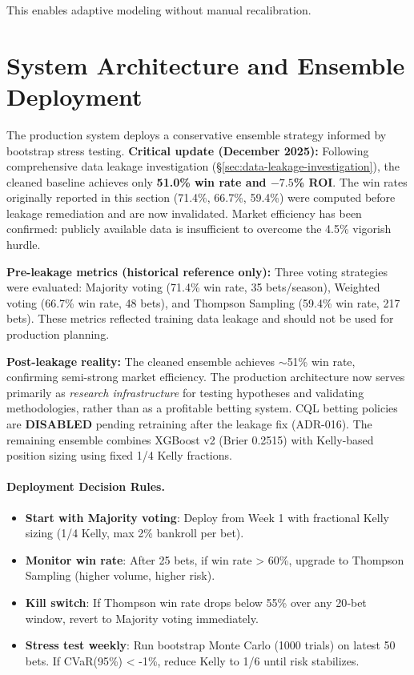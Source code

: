 This enables adaptive modeling without manual recalibration.

\section{System Architecture and Ensemble Deployment}
\label{sec:system_architecture}

The production system deploys a conservative ensemble strategy informed by bootstrap stress testing. \textbf{Critical update (December 2025):} Following comprehensive data leakage investigation (\S\ref{sec:data-leakage-investigation}), the cleaned baseline achieves only \textbf{51.0\% win rate and $-7.5$\% ROI}. The win rates originally reported in this section (71.4\%, 66.7\%, 59.4\%) were computed before leakage remediation and are now invalidated. Market efficiency has been confirmed: publicly available data is insufficient to overcome the 4.5\% vigorish hurdle.

\textbf{Pre-leakage metrics (historical reference only):} Three voting strategies were evaluated: Majority voting (71.4\% win rate, 35 bets/season), Weighted voting (66.7\% win rate, 48 bets), and Thompson Sampling (59.4\% win rate, 217 bets). These metrics reflected training data leakage and should not be used for production planning.

\textbf{Post-leakage reality:} The cleaned ensemble achieves $\sim$51\% win rate, confirming semi-strong market efficiency. The production architecture now serves primarily as \emph{research infrastructure} for testing hypotheses and validating methodologies, rather than as a profitable betting system. CQL betting policies are \textbf{DISABLED} pending retraining after the leakage fix (ADR-016). The remaining ensemble combines XGBoost v2 (Brier 0.2515) with Kelly-based position sizing using fixed 1/4 Kelly fractions.

\paragraph{Deployment Decision Rules.}
\begin{itemize}
\item \textbf{Start with Majority voting}: Deploy from Week 1 with fractional Kelly sizing (1/4 Kelly, max 2\% bankroll per bet).
\item \textbf{Monitor win rate}: After 25 bets, if win rate > 60\%, upgrade to Thompson Sampling (higher volume, higher risk).
\item \textbf{Kill switch}: If Thompson win rate drops below 55\% over any 20‑bet window, revert to Majority voting immediately.
\item \textbf{Stress test weekly}: Run bootstrap Monte Carlo (1000 trials) on latest 50 bets. If CVaR(95\%) < -1\%, reduce Kelly to 1/6 until risk stabilizes.
\end{itemize}

